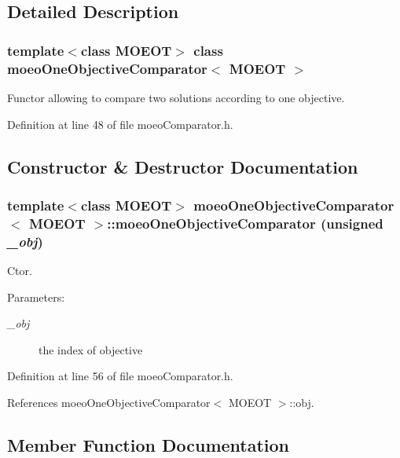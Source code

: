 \subsection{Detailed Description}
\subsubsection*{template$<$class MOEOT$>$ class moeo\-One\-Objective\-Comparator$<$ MOEOT $>$}

Functor allowing to compare two solutions according to one objective. 



Definition at line 48 of file moeo\-Comparator.h.

\subsection{Constructor \& Destructor Documentation}
\subsubsection{\setlength{\rightskip}{0pt plus 5cm}template$<$class MOEOT$>$ {\bf moeo\-One\-Objective\-Comparator}$<$ MOEOT $>$::{\bf moeo\-One\-Objective\-Comparator} (unsigned {\em \_\-obj})\hspace{0.3cm}{\tt  [inline]}}\label{classmoeoOneObjectiveComparator_5b8b31285c72a6fd17eba4e3ce0317fd}


Ctor. 

\begin{Desc}
\item[Parameters:]
\begin{description}
\item[{\em \_\-obj}]the index of objective \end{description}
\end{Desc}


Definition at line 56 of file moeo\-Comparator.h.

References moeo\-One\-Objective\-Comparator$<$ MOEOT $>$::obj.

\subsection{Member Function Documentation}
